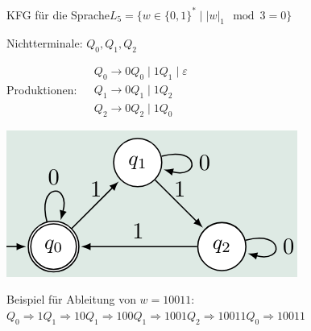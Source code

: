 \begin{example2}{KFG für die Sprache}$L_5=\{w \in\{0,1\}^* \mid |w|_1 \mod 3=0\}$

    \begin{minipage}{0.6\linewidth}
    Nichtterminale: $Q_0, Q_1, Q_2$

    Produktionen:
    $
    \begin{aligned}
    & Q_0 \rightarrow 0 Q_0 \mid 1 Q_1 \mid \varepsilon \\
    & Q_1 \rightarrow 0 Q_1 \mid 1 Q_2 \\
    & Q_2 \rightarrow 0 Q_2 \mid 1 Q_0
    \end{aligned}
    $
    \end{minipage}
    \begin{minipage}{0.39\linewidth}
        \includegraphics[width=1\linewidth]{images/kfg_reg.png}
    \end{minipage}

    \vspace{1mm}

Beispiel für Ableitung von $w=10011$:
$
Q_0 \Rightarrow 1 Q_1 \Rightarrow 10 Q_1 \Rightarrow 100 Q_1 \Rightarrow 1001 Q_2 \Rightarrow 10011 Q_0 \Rightarrow 10011
$ 
\end{example2}
